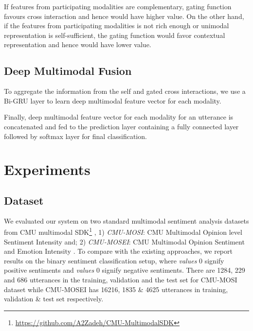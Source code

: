 \documentclass{article}
\begin{document}
If features from participating modalities are complementary, gating function favours cross interaction and hence would have higher value. On the other hand, if the features from participating modalities is not rich enough or unimodal representation is self-sufficient, the gating function would favor contextual representation and hence would have lower value.

\subsection{Deep Multimodal Fusion}
To aggregate the information from the self and gated cross interactions, we use a Bi-GRU layer to learn deep multimodal feature vector for each modality.


Finally, deep multimodal feature vector for each modality for an utterance is concatenated and fed to the prediction layer containing a fully connected layer followed by softmax layer for final  classification.


\section{Experiments}
\label{sec:experiments}
\subsection{Dataset}
We evaluated our system on two standard multimodal sentiment analysis datasets from CMU multimodal SDK\footnote{ \url{https://github.com/A2Zadeh/CMU-MultimodalSDK}} \cite{zadeh2018multi}, 1) \textit{CMU-MOSI}: CMU Multimodal Opinion level Sentiment Intensity \cite{DBLP:journals/corr/ZadehZPM16} and; 2) \textit{CMU-MOSEI}: CMU Multimodal Opinion Sentiment and Emotion Intensity \cite{DBLP:conf/acl/MorencyCPLZ18}. To compare with the existing approaches, we report results on the binary sentiment classification setup, where \textit{values}  0 signify positive sentiments and \textit{values}  0 signify negative sentiments. There are 1284, 229 and 686 utterances in the training, validation and the test set for CMU-MOSI dataset while CMU-MOSEI has 16216, 1835 \& 4625 utterances in  training, validation \& test set respectively.
\end{document}
